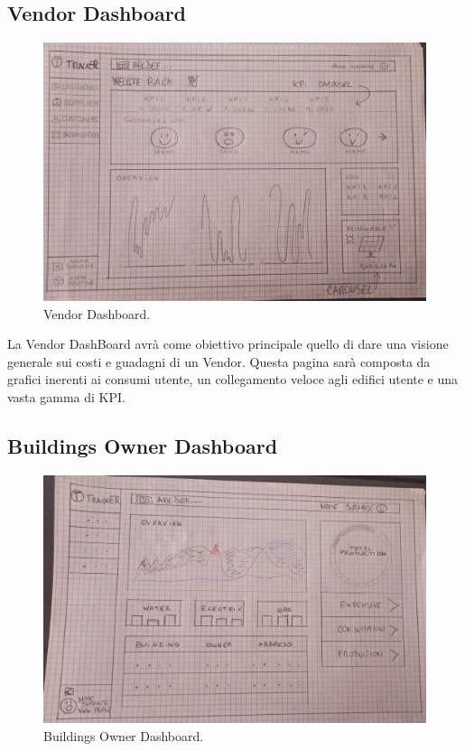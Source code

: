 \documentclass{report}
\begin{document}
\subsection{Vendor Dashboard}
\begin{figure}[H]
  \includegraphics[width=\linewidth]{Vendor.jpeg}
  \caption{Vendor Dashboard.}
  \label{fig:Vendor Dashboard}
\end{figure}
La  Vendor DashBoard avrà come obiettivo principale quello di dare una visione generale sui costi e guadagni di un Vendor.
Questa pagina sarà composta da grafici inerenti ai consumi utente, un collegamento veloce agli edifici utente e una vasta gamma di KPI. 
\FloatBarrier


\subsection{Buildings Owner Dashboard}
\begin{figure}[H]
  \includegraphics[width=\linewidth]{buildingsOwner.jpeg}
  \caption{Buildings Owner Dashboard.}
  \label{fig:Buildings Owner Dashboard}
\end{figure}
\end{document}
